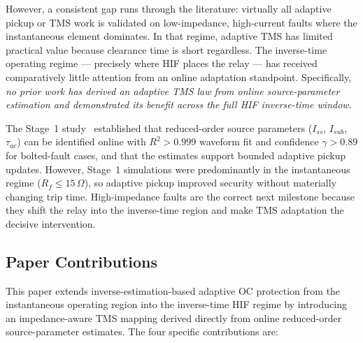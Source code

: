 \documentclass[10pt,journal,twoside]{IEEEtran}
\newcommand{\Rf}{R_{\!f}}
\begin{document}
However, a consistent gap runs through the literature: virtually all adaptive
pickup or TMS work is validated on low-impedance, high-current faults where
the instantaneous element dominates.  In that regime, adaptive TMS has
limited practical value because clearance time is short regardless.
The inverse-time operating regime --- precisely where HIF places the relay
--- has received comparatively little attention from an online adaptation
standpoint.  Specifically, \emph{no prior work has derived an adaptive TMS
law from online source-parameter estimation and demonstrated its benefit
across the full HIF inverse-time window}.

The Stage~1 study~\cite{Eluvathingal2025_TR01} established that reduced-order
source parameters ($I_{ss}$, $I_{sub}$, $\tau_{ac}$) can be identified online
with $R^2 > 0.999$ waveform fit and confidence $\gamma > 0.89$ for bolted-fault
cases, and that the estimates support bounded adaptive pickup updates.  However,
Stage~1 simulations were predominantly in the instantaneous regime
($\Rf \leq 15\,\Omega$), so adaptive pickup improved security without
materially changing trip time.  High-impedance faults are the correct next
milestone because they shift the relay into the inverse-time region and make
TMS adaptation the decisive intervention.

\subsection{Paper Contributions}

This paper extends inverse-estimation-based adaptive OC protection from the
instantaneous operating region into the inverse-time HIF regime by introducing
an impedance-aware TMS mapping derived directly from online reduced-order
source-parameter estimates.  The four specific contributions are:
\end{document}
